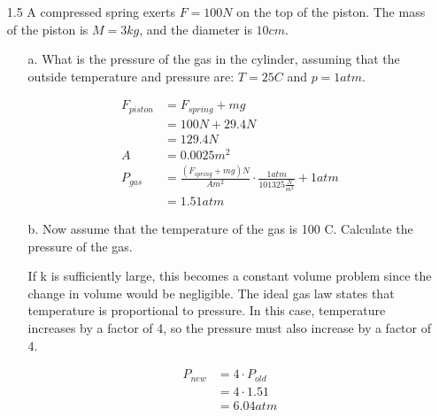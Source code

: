\documentclass[10pt, a4paper]{article}
\begin{document}
\begin{enumerate}
  \item[1.5] A compressed spring exerts $F=100N$ on the top of the piston. The mass of the piston is $M=3kg$, and the diameter is
    $10 cm$.
    \begin{enumerate}
      \item[a.] What is the pressure of the gas in the cylinder, assuming that the outside temperature and pressure are:
        $T=25C$ and $p=1atm$.

        \setcounter{equation}{0}
        \begin{align}
          F_{piston} &= F_{spring} + mg \\
          &= 100N + 29.4N \\
          &= 129.4 N \\
          A &= 0.0025 m^2 \\
          P_{gas} &= \frac{(F_{spring} + mg)N}{A m^2} \cdot \frac{1 atm}{101325\frac{N}{m^2}} + 1atm \\
          &= 1.51 atm
        \end{align}

      \item[b.] Now assume that the temperature of the gas is 100 C. Calculate the pressure of the gas.

        If k is sufficiently large, this becomes a constant volume problem since the change in volume would
        be negligible. The ideal gas law states that temperature is proportional to pressure. In this case,
        temperature increases by a factor of 4, so the pressure must also increase by a factor of 4.

        \setcounter{equation}{0}
        \begin{align}
          P_{new} &= 4 \cdot P_{old} \\
          &= 4 \cdot 1.51 \\
          &= 6.04 atm
        \end{align}

    \end{enumerate}

\end{enumerate}
\end{document}
